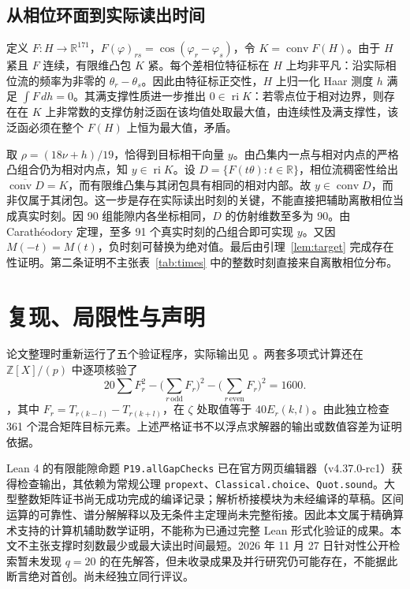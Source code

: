 \documentclass[11pt,a4paper]{article}
\newcommand{\R}{\mathbb R}\newcommand{\Q}{\mathbb Q}\newcommand{\Z}{\mathbb Z}\newcommand{\T}{\mathbb T}
\DeclareMathOperator{\conv}{conv}\DeclareMathOperator{\ri}{ri}
\begin{document}
\subsection{从相位环面到实际读出时间}
定义 $F:H\to\R^{171}$，$F(\varphi)_{rs}=\cos(\varphi_r-\varphi_s)$，令 $K=\conv F(H)$。由于 $H$ 紧且 $F$ 连续，有限维凸包 $K$ 紧。每个差相位特征标在 $H$ 上均非平凡：沿实际相位流的频率为非零的 $\theta_r-\theta_s$。因此由特征标正交性，$H$ 上归一化 Haar 测度 $h$ 满足 $\int F\,dh=0$。其满支撑性质进一步推出 $0\in\ri K$：若零点位于相对边界，则存在在 $K$ 上非常数的支撑仿射泛函在该均值处取最大值，由连续性及满支撑性，该泛函必须在整个 $F(H)$ 上恒为最大值，矛盾。

取 $\rho=(18\nu+h)/19$，恰得到目标相干向量 $y$。由凸集内一点与相对内点的严格凸组合仍为相对内点，知 $y\in\ri K$。设 $D=\{F(t\theta):t\in\R\}$，相位流稠密性给出 $\overline{\conv D}=K$，而有限维凸集与其闭包具有相同的相对内部\cite{rock}。故 $y\in\conv D$，而非仅属于其闭包。这一步是存在实际读出时刻的关键，不能直接把辅助离散相位当成真实时刻。因 90 组能隙内各坐标相同，$D$ 的仿射维数至多为 90。由 Carathéodory 定理，至多 91 个真实时刻的凸组合即可实现 $y$。又因 $M(-t)=M(t)$，负时刻可替换为绝对值。最后由引理~\ref{lem:target} 完成存在性证明。第二条证明不主张表~\ref{tab:times} 中的整数时刻直接来自离散相位分布。
\section{复现、局限性与声明}
论文整理时重新运行了五个验证程序，实际输出见 。两套多项式计算还在 $\Z[X]/(p)$ 中逐项核验了 \[20\sum F_r^2-\Big(\sum_{r\,\mathrm{odd}} F_r\Big)^2-\Big(\sum_{r\,\mathrm{even}} F_r\Big)^2=1600.\]，其中 $F_r=T_{r(k-l)}-T_{r(k+l)}$，在 $\zeta$ 处取值等于 $40E_r(k,l)$。由此独立检查 361 个混合矩阵目标元素。上述严格证书不以浮点求解器的输出或数值容差为证明依据。

Lean 4 的有限能隙命题 \texttt{P19.allGapChecks} 已在官方网页编辑器（v4.37.0-rc1）获得检查输出，其依赖为常规公理 \texttt{propext}、\texttt{Classical.choice}、\texttt{Quot.sound}。大型整数矩阵证书尚无成功完成的编译记录；解析桥接模块为未经编译的草稿。区间运算的可靠性、谱分解解释以及无条件主定理尚未完整衔接。因此本文属于精确算术支持的计算机辅助数学证明，不能称为已通过完整 Lean 形式化验证的成果。本文不主张支撑时刻数最少或最大读出时间最短。2026 年 11 月 27 日针对性公开检索暂未发现 $q=20$ 的在先解答，但未收录成果及并行研究仍可能存在，不能据此断言绝对首创。尚未经独立同行评议。
\end{document}
